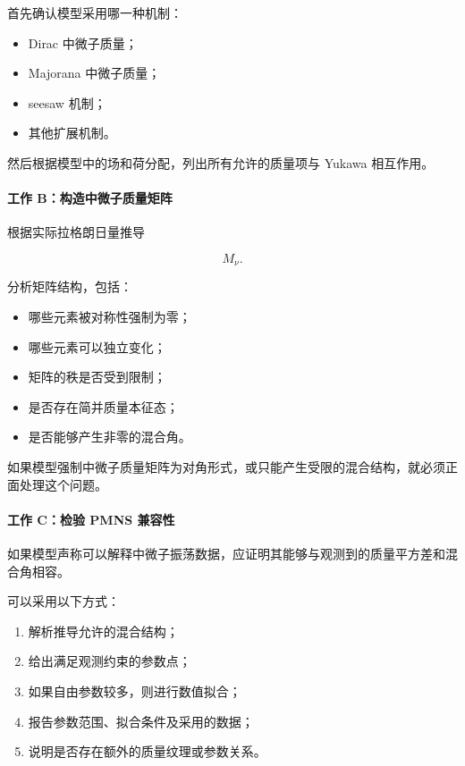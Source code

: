 \documentclass[
]{article}
\providecommand{\tightlist}{%
  \setlength{\itemsep}{0pt}\setlength{\parskip}{0pt}}
\begin{document}
首先确认模型采用哪一种机制：

\begin{itemize}
\tightlist
\item
  Dirac 中微子质量；
\item
  Majorana 中微子质量；
\item
  seesaw 机制；
\item
  其他扩展机制。
\end{itemize}

然后根据模型中的场和荷分配，列出所有允许的质量项与 Yukawa 相互作用。

\paragraph{工作
B：构造中微子质量矩阵}\label{ux5de5ux4f5c-bux6784ux9020ux4e2dux5faeux5b50ux8d28ux91cfux77e9ux9635}

根据实际拉格朗日量推导

\[
M_\nu.
\]

分析矩阵结构，包括：

\begin{itemize}
\tightlist
\item
  哪些元素被对称性强制为零；
\item
  哪些元素可以独立变化；
\item
  矩阵的秩是否受到限制；
\item
  是否存在简并质量本征态；
\item
  是否能够产生非零的混合角。
\end{itemize}

如果模型强制中微子质量矩阵为对角形式，或只能产生受限的混合结构，就必须正面处理这个问题。

\paragraph{工作 C：检验 PMNS
兼容性}\label{ux5de5ux4f5c-cux68c0ux9a8c-pmns-ux517cux5bb9ux6027}

如果模型声称可以解释中微子振荡数据，应证明其能够与观测到的质量平方差和混合角相容。

可以采用以下方式：

\begin{enumerate}
\def\labelenumi{\arabic{enumi}.}
\tightlist
\item
  解析推导允许的混合结构；
\item
  给出满足观测约束的参数点；
\item
  如果自由参数较多，则进行数值拟合；
\item
  报告参数范围、拟合条件及采用的数据；
\item
  说明是否存在额外的质量纹理或参数关系。
\end{enumerate}
\end{document}
